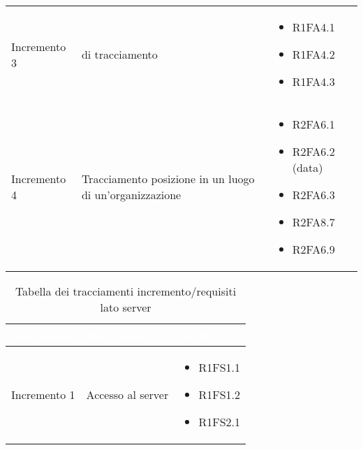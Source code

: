 {\begin{longtable}{C{4cm} C{6cm} C{4cm}}
Incremento 3 &  di tracciamento & \begin{itemize}
    \item[ ] R1FA4.1
    \item[ ] R1FA4.2
    \item[ ] R1FA4.3
\end{itemize}\\

Incremento 4 & Tracciamento posizione in un luogo di un'organizzazione & \begin{itemize}
    \item[ ] R2FA6.1
    \item[ ] R2FA6.2 (data)
    \item[ ] R2FA6.3
    \item[ ] R2FA8.7
    \item[ ] R2FA6.9
\end{itemize}\\


\end{longtable}
}


{
\renewcommand{\arraystretch}{2}
\centering
	
\begin{longtable}{C{4cm} C{6cm} C{4cm}}
\caption{Tabella dei tracciamenti incremento/requisiti lato server}\\

\textcolor{white}{\textbf{Incremento}} &
\textcolor{white}{\textbf{Descrizione}} & 
\textcolor{white}{\textbf{Requisiti}}\\	
\endhead

Incremento 1 & Accesso al server & \begin{itemize}
    \item[ ] R1FS1.1
    \item[ ] R1FS1.2 
    \item[ ] R1FS2.1
\end{itemize}\\
\end{longtable}
}
